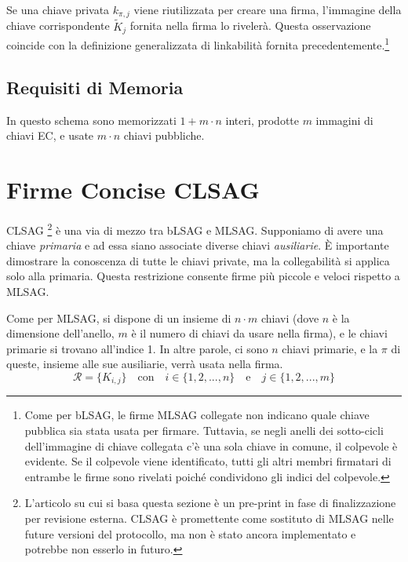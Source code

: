 Se una chiave privata \(k_{\pi, j}\) viene riutilizzata per creare una firma, l’immagine della chiave corrispondente \(\tilde{K}_j\) fornita nella firma lo rivelerà. Questa osservazione coincide con la definizione generalizzata di linkabilità fornita precedentemente.\footnote{Come per bLSAG, le firme MLSAG collegate non indicano quale chiave pubblica sia stata usata per firmare. Tuttavia, se negli anelli dei sotto-cicli dell’immagine di chiave collegata c’è una sola chiave in comune, il colpevole è evidente. Se il colpevole viene identificato, tutti gli altri membri firmatari di entrambe le firme sono rivelati poiché condividono gli indici del colpevole.}


\subsection*{Requisiti di Memoria}

In questo schema sono memorizzati \(1 + m \cdot n\) interi, prodotte \(m\) immagini di chiavi EC, e usate \(m \cdot n\) chiavi pubbliche.



\section{Firme Concise CLSAG}
\label{sec:CLSAG}

CLSAG \cite{MRL-0011-CLSAG}\footnote{L’articolo su cui si basa questa sezione è un pre-print in fase di finalizzazione per revisione esterna. CLSAG è promettente come sostituto di MLSAG nelle future versioni del protocollo, ma non è stato ancora implementato e potrebbe non esserlo in futuro.} è una via di mezzo tra bLSAG e MLSAG. Supponiamo di avere una chiave \emph{primaria} e ad essa siano associate diverse chiavi \emph{ausiliarie}. È importante dimostrare la conoscenza di tutte le chiavi private, ma la collegabilità si applica solo alla primaria. Questa restrizione consente firme più piccole e veloci rispetto a MLSAG.

Come per MLSAG, si dispone di un insieme di \(n \cdot m\) chiavi (dove \(n\) è la dimensione dell’anello, \(m\) è il numero di chiavi da usare nella firma), e le chiavi primarie si trovano all’indice 1. In altre parole, ci sono \(n\) chiavi primarie, e la \(\pi\) di queste, insieme alle sue ausiliarie, verrà usata nella firma.\vspace{.175cm}
\[\mathcal{R} = \{K_{i,j}\} \quad \textrm{con} \quad i \in \{1, 2, ..., n\} \quad \textrm{e} \quad j \in \{1, 2, ..., m\}\]

